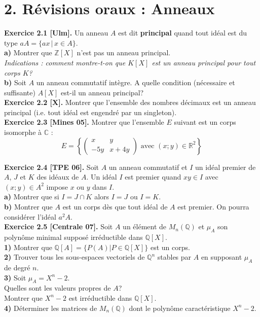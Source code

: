 \documentclass[a4paper,12pt,francais]{article}
\newcommand{\field}[1]{\mathbb{#1}}
\newcommand{\Z}{\field{Z}}
\newcommand{\R}{\field{R}}
\newcommand{\Q}{\field{Q}}
\newcommand{\C}{\field{C}}
\begin{document}
\newpage
\section*{2. Révisions oraux : Anneaux}

\noindent
{\bf Exercice 2.1 [Ulm].} Un anneau $A$ est dit {\bf principal} quand tout idéal est du type $aA=\{ax\,|\, x \in A\}$.\\
\indent
{\bf a)} Montrer que
$\Z[X]$ n'est pas un anneau principal.\\
{\it Indications : comment montre-t-on que $K[X]$ est un anneau
  principal pour tout corps $K$?}\\
\indent
{\bf b)} Soit $A$ un anneau commutatif intègre. A quelle condition (nécessaire
et suffisante) $A[X]$ est-il un anneau principal?\\

\noindent
{\bf Exercice 2.2 [X].} Montrer que l'ensemble des nombres décimaux est
un anneau principal (i.e. tout idéal est engendré par un singleton).\\

\noindent
{\bf Exercice 2.3 [Mines 05].} Montrer que l'ensemble $E$ suivant est un
corps isomorphe à $\C$ :
$$E=\left\{ {
\left({\begin{array}{cc}
x&y\\
-5y&x+4y
\end{array} }\right) \mbox{ avec } (x;y) \in \R^2} \right \}$$

\noindent
{\bf Exercice 2.4 [TPE 06].} Soit $A$ un anneau commutatif et $I$ un
idéal premier de $A$, $J$ et $K$ des idéaux de $A$. Un idéal $I$ est
premier quand $xy\in I$ avec $(x;y)\in A^2$ impose $x$ ou $y$ dans
$I$.\\
{\bf a)} Montrer que si $I=J\cap K$ alors $I=J$ ou $I=K$.\\
{\bf b)} Montrer que $A$ est un corps dès que tout idéal de $A$ est premier. On pourra considérer l'idéal
$a^2A$.\\

\noindent
{\bf Exercice 2.5 [Centrale 07].} Soit $A$ un élément de $M_n(\Q)$ et $\mu_A$ son polynôme minimal supposé irréductible dans $\Q[X]$.\\
\indent
{\bf 1)} Montrer que $\Q[A]=\{P(A)| P\in \Q[X]\}$ est un corps.\\
\indent
{\bf 2)} Trouver tous les sous-espaces vectoriels de $\Q^n$ stables par $A$ en supposant $\mu_A$  de degré $n$.\\
\indent
{\bf 3)} Soit $\mu_A=X^n-2$.\\
\indent {} Quelles sont les valeurs propres de $A$?\\
\indent {} Montrer que $X^n-2$ est irréductible dans $\Q[X]$.\\
\indent
{\bf 4)} Déterminer les matrices de $M_n(\Q)$ dont le polynôme caractéristique $X^n-2$.\\
\end{document}
